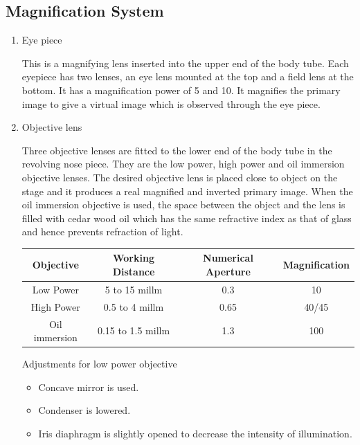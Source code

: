 \documentclass[a4paper,12pt]{book}
\begin{document}
		\subsection*{Magnification System}
		\begin{enumerate}

			\item{Eye piece
				\par This is a magnifying lens inserted into the upper end of the body tube. Each eyepiece has two lenses, an eye lens mounted at the top and a field lens at the bottom. It has a magnification power of 5 and 10. It magnifies the primary image to give a virtual image which is observed through the eye piece.}
			\item{Objective lens

				\par Three objective lenses are fitted to the lower end of the body tube in the revolving nose piece. They are the low power, high power and oil immersion objective lenses. The desired objective lens is placed close to object on the stage and it produces a real magnified and inverted primary image. When the oil immersion objective is used, the space between the object and the lens is filled with cedar wood oil which has the same refractive index as that of glass and hence prevents refraction of light.\newline
				\begin{tabular}{c | c | c | c}
					\hline
					Objective & Working Distance & Numerical Aperture &Magnification\\
					\hline
					Low Power & 5 to 15 millm & 0.3 & 10\\
					\hline
					High Power
					&0.5 to 4 millm
					&0.65
					&40/45 \\
					\hline

					Oil immersion
					&0.15 to 1.5 millm
					&1.3
					&100 \\

					\hline





				\end{tabular}

				\par
				Adjustments for low power objective
				\begin{itemize}
					\item {Concave mirror is used.}
					\item {Condenser is lowered.}
					\item {Iris diaphragm is slightly opened to decrease the intensity of illumination.}
				\end{itemize}

}
\end{enumerate}
\end{document}

